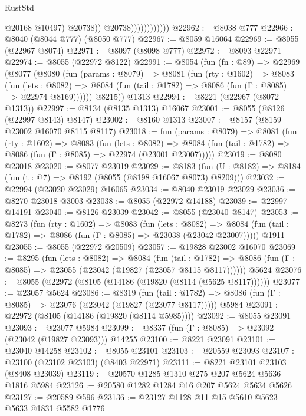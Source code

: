 \begin{lexlean}{RustStd}
\begin{coremodule}
                                  @20168
                                  @10497)
                                @20738))
                            @20738))))))))))))
@22962 := @8038 @777
@22966 := @8040 (@8044 @777) (@8050 @777)
@22967 := @8059 @16064
@22969 := @8055 (@22967 @8074)
@22971 := @8097 (@8098 @777)
@22972 := @8093 @22971
@22974 := @8055 (@22972 @8122)
@22991 := @8054
    (fun (fn : @89) =>
    @22969
      (@8077
        (@8080
          (fun (params : @8079) =>
          @8081
            (fun (rty : @1602) =>
            @8083
              (fun (lets : @8082) =>
              @8084 (fun (tail : @1782) => @8086 (fun (Γ : @8085) => @22974 @8169))))))
        @8215))
    @1313
@22994 := @8221 (@22967 (@8072 @1313))
@22997 := @8134 (@8135 @1313) @16067
@23001 := @8055 (@8126 (@22997 @8143) @8147)
@23002 := @8160 @1313
@23007 := @8157 (@8159 @23002 @16070 @8115 @8117)
@23018 := fun (params : @8079) =>
  @8081
    (fun (rty : @1602) =>
    @8083
      (fun (lets : @8082) =>
      @8084 (fun (tail : @1782) => @8086 (fun (Γ : @8085) => @22974 (@23001 @23007)))))
@23019 := @8080 @23018
@23020 := @8077 @23019
@23029 := @8183
    (fun (U : @8182) => @8184 (fun (t : @7) => @8192 (@8055 (@8198 @16067 @8073) @8209)))
@23032 := @22994 (@23020 @23029) @16065
@23034 := @8040 @23019 @23029
@23036 := @8270 @23018 @3003
@23038 := @8055 (@22972 @14188)
@23039 := @22997 @14191
@23040 := @8126 @23039
@23042 := @8055 (@23040 @8147)
@23053 := @8273
    (fun (rty : @1602) =>
    @8083
      (fun (lets : @8082) =>
      @8084 (fun (tail : @1782) => @8086 (fun (Γ : @8085) => @23038 (@23042 @23007)))))
    @1911
@23055 := @8055 (@22972 @20509)
@23057 := @19828 @23002 @16070
@23069 := @8295
    (fun (lets : @8082) =>
    @8084
      (fun (tail : @1782) =>
      @8086 (fun (Γ : @8085) => @23055 (@23042 (@19827 (@23057 @8115 @8117))))))
    @5624
@23076 := @8055 (@22972 (@8105 (@14186 (@19820 (@8114 (@5625 @8117))))))
@23077 := @23057 @5624
@23086 := @8319
    (fun (tail : @1782) => @8086 (fun (Γ : @8085) => @23076 (@23042 (@19827 (@23077 @8117)))))
    @5984
@23091 := @22972 (@8105 (@14186 (@19820 (@8114 @5985))))
@23092 := @8055 @23091
@23093 := @23077 @5984
@23099 := @8337 (fun (Γ : @8085) => @23092 (@23042 (@19827 @23093))) @14255
@23100 := @8221 @23091
@23101 := @23040 @14258
@23102 := @8055 @23101
@23103 := @20559 @23093
@23107 := @23100 (@23102 @23103) (@8403 @22971)
@23111 := @8221 @23101 @23103 (@8408 @23039)
@23119 := @20570 @1285 @1310 @275 @207 @5624 @5636 @1816 @5984
@23126 := @20580 @1282 @1284 @16 @207 @5624 @5634 @5626
@23127 := @20589 @596
@23136 := @23127 @1128 @11 @15 @5610 @5623 @5633 @1831 @5582 @1776

\end{coremodule}
\end{lexlean}
